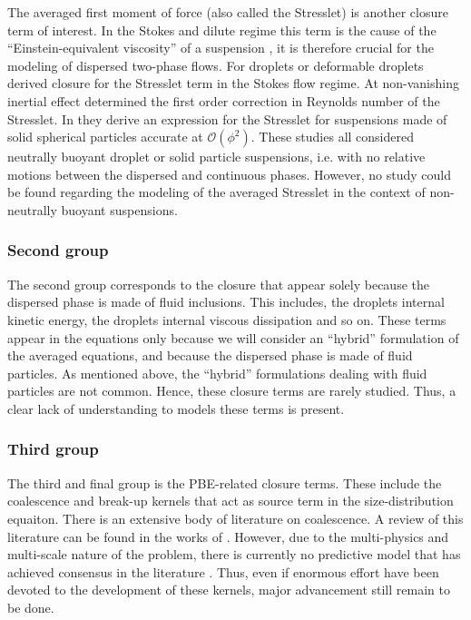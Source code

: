 The averaged first moment of force (also called the Stresslet) is another closure term of interest.
In the Stokes and dilute regime this term is the cause of the ``Einstein-equivalent viscosity''  of a suspension \citep{guazzelli2011}, it is therefore crucial for the modeling of dispersed two-phase flows. 
For droplets or deformable droplets \citet{strallison1978note,nadim1996concise} derived closure for the Stresslet term in the Stokes flow regime.  
At non-vanishing inertial effect \citet{raja2010inertial} determined the first order correction in Reynolds number of the Stresslet. 
In \citet{batchelor1972hydrodynamic,hinch1977averaged} they derive an expression for the Stresslet for suspensions made of solid spherical particles accurate at $\mathcal{O}(\phi^2)$.
These studies all considered neutrally buoyant droplet or solid particle suspensions, i.e. with no relative motions between the dispersed and continuous phases. 
However, no study could be found regarding the modeling of the averaged Stresslet in the context of non-neutrally buoyant suspensions. %

\subsubsection{Second group}

The second group corresponds to the closure that appear solely because the dispersed phase is made of fluid inclusions. 
This includes, the droplets internal kinetic energy, the droplets internal viscous dissipation and so on. 
These terms appear in the equations only because we will consider an ``hybrid'' formulation of the averaged equations, and because the dispersed phase is made of fluid particles. 
As mentioned above, the ``hybrid'' formulations dealing with fluid particles are not common. 
Hence, these closure terms are rarely studied. 
Thus, a clear lack of understanding to models these terms is present.  

\subsubsection{Third group}

The third and final group is the PBE-related closure terms. 
These include the coalescence and break-up kernels that act as source term in the size-distribution equaiton. 
There is an extensive body of literature on coalescence. 
A review of this literature can be found in the works of \citet{chesters1991modelling}. 
However, due to the multi-physics and multi-scale nature of the problem, there is currently no predictive model that has achieved consensus in the literature \citep{liao2010literature}. 
Thus, even if enormous effort have been devoted to the development of these kernels, major advancement still remain to be done. 



